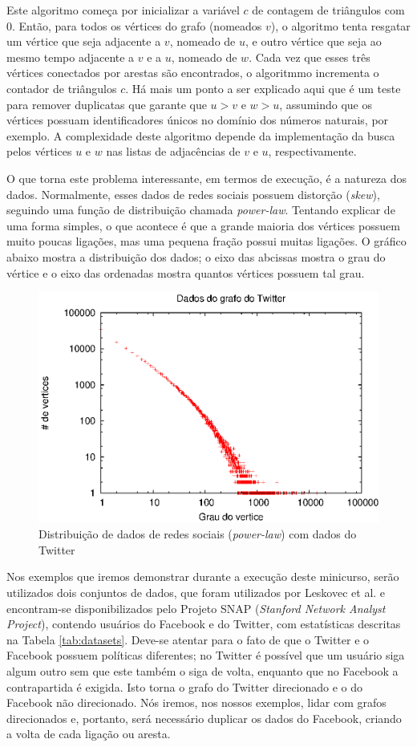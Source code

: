 Este algoritmo começa por inicializar a variável $c$ de contagem de triângulos com $0$. Então, para
todos os vértices do grafo (nomeados $v$), o algoritmo tenta resgatar um vértice que seja adjacente a 
$v$, nomeado de $u$, e outro vértice que seja ao mesmo tempo adjacente a $v$ e a $u$, nomeado de $w$.
Cada vez que esses três vértices conectados por arestas são encontrados, o algoritmmo incrementa o 
contador de triângulos $c$. Há mais um ponto a ser explicado aqui que é um teste para remover duplicatas
que garante que $u>v$ e $w>u$, assumindo que os vértices possuam identificadores únicos no domínio dos
números naturais, por exemplo. A complexidade deste algoritmo depende da implementação da busca pelos 
vértices $u$ e $w$ nas listas de adjacências de $v$ e $u$, respectivamente.

O que torna este problema interessante, em termos de execução, é a natureza dos dados. Normalmente, esses
dados de redes sociais possuem distorção (\emph{skew}), seguindo uma função de distribuição chamada 
\emph{power-law}. Tentando explicar de uma forma simples, o que acontece é que a grande maioria dos 
vértices possuem muito poucas ligações, mas uma pequena fração possui muitas ligações. O gráfico abaixo 
mostra a distribuição dos dados; o eixo das abcissas mostra o grau do vértice e o eixo das ordenadas 
mostra quantos vértices possuem tal grau.

\begin{figure}[h!]
	\centerline{\includegraphics[width=0.7\linewidth]{power_law.eps}}
	\caption{Distribuição de dados de redes sociais (\emph{power-law}) com dados do Twitter}
	\label{fig:powerlaw}
\end{figure}

Nos exemplos que iremos demonstrar durante a execução deste minicurso, serão utilizados dois conjuntos
de dados, que foram utilizados por Leskovec et al. \cite{leskovec2012learning} e encontram-se 
disponibilizados pelo Projeto SNAP (\textit{Stanford Network Analyst Project}), contendo
usuários do Facebook e do Twitter, com estatísticas descritas na Tabela \ref{tab:datasets}.
Deve-se atentar para o fato de que o Twitter e o Facebook possuem políticas diferentes; no Twitter
é possível que um usuário siga algum outro sem que este também o siga de volta, enquanto que
no Facebook a contrapartida é exigida. Isto torna o grafo do Twitter direcionado e o do Facebook
não direcionado. Nós iremos, nos nossos exemplos, lidar com grafos direcionados e, portanto, será
necessário duplicar os dados do Facebook, criando a volta de cada ligação ou aresta.

